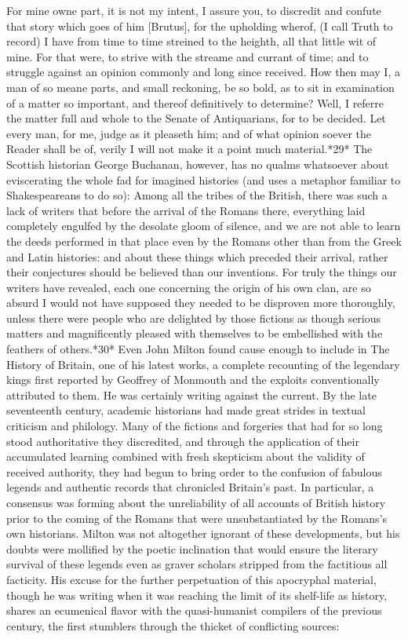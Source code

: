 For mine owne part, it is not my intent, I assure you, to discredit and confute that story which goes of him [Brutus], for the upholding wherof, (I call Truth to record) I have from time to time streined to the heighth, all that little wit of mine. For that were, to strive with the streame and currant of time; and to struggle against an opinion commonly and long since received. How then may I, a man of so meane parts, and small reckoning, be so bold, as to sit in examination of a matter so important, and thereof definitively to determine? Well, I referre the matter full and whole to the Senate of Antiquarians, for to be decided. Let every man, for me, judge as it pleaseth him; and of what opinion soever the Reader shall be of, verily I will not make it a point much material.*29*
The Scottish historian George Buchanan, however, has no qualms whatsoever about eviscerating the whole fad for imagined histories (and uses a metaphor familiar to Shakespeareans to do so):
Among all the tribes of the British, there was such a lack of writers that before the arrival of the Romans there, everything laid completely engulfed by the desolate gloom of silence, and we are not able to learn the deeds performed in that place even by the Romans other than from the Greek and Latin histories: and about these things which preceded their arrival, rather their conjectures should be believed than our inventions. For truly the things our writers have revealed, each one concerning the origin of his own clan, are so absurd I would not have supposed they needed to be disproven more thoroughly, unless there were people who are delighted by those fictions as though serious matters and magnificently pleased with themselves to be embellished with the feathers of others.*30*
Even John Milton found cause enough to include in The History of Britain, one of his latest works, a complete recounting of the legendary kings first reported by Geoffrey of Monmouth and the exploits conventionally attributed to them. He was certainly writing against the current. By the late seventeenth century, academic historians had made great strides in textual criticism and philology. Many of the fictions and forgeries that had for so long stood authoritative they discredited, and through the application of their accumulated learning combined with fresh skepticism about the validity of received authority, they had begun to bring order to the confusion of fabulous legends and authentic records that chronicled Britain's past. In particular, a consensus was forming about the unreliability of all accounts of British history prior to the coming of the Romans that were unsubstantiated by the Romans's own historians. Milton was not altogether ignorant of these developments, but his doubts were mollified by the poetic inclination that would ensure the literary survival of these legends even as graver scholars stripped from the factitious all facticity. His excuse for the further perpetuation of this apocryphal material, though he was writing when it was reaching the limit of its shelf-life as history, shares an ecumenical flavor with the quasi-humanist compilers of the previous century, the first stumblers through the thicket of conflicting sources:
